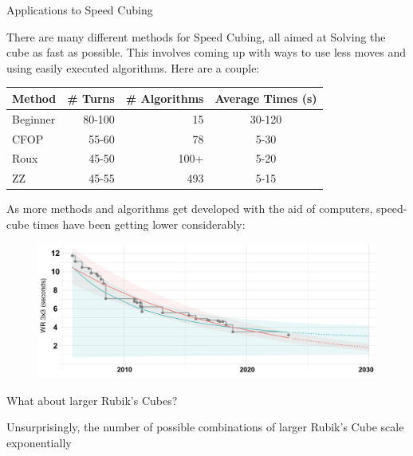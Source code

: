 \documentclass[final]{beamer}
\newlength{\colwidth}
\begin{document}
\begin{frame}[t]
\begin{columns}[t]
\begin{column}{\colwidth}

  \begin{block}{Applications to Speed Cubing}

    \large There are many different methods for Speed Cubing, all aimed at Solving
    the cube as fast as possible. This involves coming up with ways to use
    less moves and using easily executed algorithms. Here are a couple:

    \begin{table}
      \centering
      \begin{tabular}{l r r c}
        \toprule
        \textbf{Method} & \textbf{\# Turns} & \textbf{\# Algorithms} & \textbf{Average Times (s)} \\
        \midrule
        Beginner & 80-100 & 15 & 30-120 \\
        CFOP & 55-60 & 78 & 5-30 \\
        Roux & 45-50 & 100+ & 5-20 \\
        ZZ & 45-55 & 493 & 5-15 \\
        \bottomrule
      \end{tabular}
    \end{table}


  As more methods and algorithms get developed with the aid of computers,
  speed-cube times have been getting lower considerably:

  \begin{figure}
    \centering
      \includegraphics[width=1.0\textwidth]{logos/solveprogression.png}
  \end{figure}

  \end{block}

  \begin{block}{What about larger Rubik's Cubes?}
    
    \large Unsurprisingly, the number of possible combinations of larger Rubik's Cube scale exponentially \\
    

\end{block}
\end{column}
\end{columns}
\end{frame}
\end{document}
